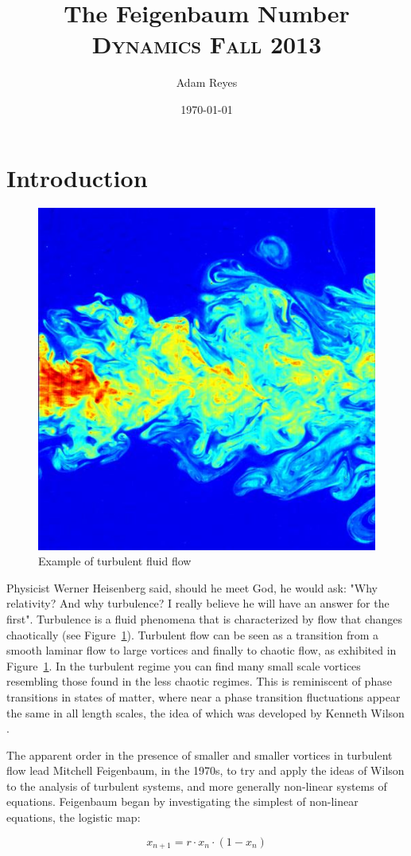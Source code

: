 \documentclass[paper=a4, fontsize=11pt, abstract=on]{scrartcl} %
\title{	
The Feigenbaum Number
\horrule{0.5pt}
\normalfont \normalsize 
\textsc{Dynamics Fall 2013}
}
\author{Adam Reyes} %
\date{\normalsize\today} %
\numberwithin{equation}{section}
\numberwithin{figure}{section}
\numberwithin{table}{section}
\begin{document}
\maketitle

\section{Introduction}
\label{sec:intro}

\begin{figure}
  \centering
  \includegraphics[width=.4\textwidth]{Jet}
  \caption{Example of turbulent fluid flow\cite{wiki}}
  \label{fig:turb}
\end{figure}

Physicist Werner Heisenberg said, should he meet 
God, he would ask: "Why relativity? And why turbulence? I really believe he will have
an answer for the first". Turbulence is a fluid phenomena that is
characterized by flow that changes chaotically (see
Figure~\ref{fig:turb}). Turbulent flow can be seen as a transition
from a smooth laminar flow to large vortices and finally to chaotic flow, as exhibited in
Figure~\ref{fig:turb}. In the turbulent regime you can find many small
scale vortices resembling those found in the less chaotic
regimes. This is reminiscent of phase transitions in states of matter,
where near a phase transition fluctuations appear the same in all
length scales, the idea of which was developed by Kenneth Wilson \cite{Wilson}.

\vline

The apparent order in the presence of smaller and smaller vortices in
turbulent flow lead Mitchell Feigenbaum, in the 1970s, to try and
apply the ideas of Wilson to the analysis of turbulent systems, and
more generally non-linear systems of equations. Feigenbaum began by
investigating the simplest of non-linear equations, the logistic map:

\begin{equation}
  \label{eq:logmap}
  x_{n+1} = r\cdot x_n \cdot (1 - x_n)
\end{equation}
\end{document}
